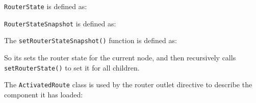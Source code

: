 \texttt{RouterState}
is defined as:



\texttt{RouterStateSnapshot}
is defined as:



The
\texttt{setRouterStateSnapshot()}
function is defined as:



So its sets the router state for the current node, and then recursively calls
\texttt{setRouterState()}
to set it for all children.

The
\texttt{ActivatedRoute}
class is used by the router outlet directive to describe the
component it has loaded:



